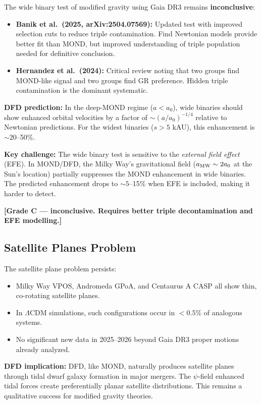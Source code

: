 \documentclass[11pt]{article}
\newcommand{\LCDM}{$\Lambda$CDM}
\newcommand{\aM}{a_0}
\begin{document}
The wide binary test of modified gravity using Gaia DR3 remains
\textbf{inconclusive}:

\begin{itemize}
  \item \textbf{Banik et al.\ (2025, arXiv:2504.07569):} Updated test
    with improved selection cuts to reduce triple contamination.
    Find Newtonian models provide better fit than MOND, but improved
    understanding of triple population needed for definitive conclusion.
  \item \textbf{Hernandez et al.\ (2024):} Critical review noting that
    two groups find MOND-like signal and two groups find GR preference.
    Hidden triple contamination is the dominant systematic.
\end{itemize}

\textbf{DFD prediction:} In the deep-MOND regime ($a < \aM$), wide
binaries should show enhanced orbital velocities by a factor of
$\sim (a/\aM)^{-1/4}$ relative to Newtonian predictions. For the
widest binaries ($s > 5$ kAU), this enhancement is $\sim 20$--50\%.

\textbf{Key challenge:} The wide binary test is sensitive to the
\emph{external field effect} (EFE). In MOND/DFD, the Milky Way's
gravitational field ($a_{\rm MW} \sim 2\aM$ at the Sun's location)
partially suppresses the MOND enhancement in wide binaries. The
predicted enhancement drops to $\sim 5$--15\% when EFE is included,
making it harder to detect.

\textbf{[Grade C --- inconclusive. Requires better triple decontamination
and EFE modelling.]}

\subsection{Satellite Planes Problem}

The satellite plane problem persists:
\begin{itemize}
  \item Milky Way VPOS, Andromeda GPoA, and Centaurus A CASP all show
    thin, co-rotating satellite planes.
  \item In \LCDM{} simulations, such configurations occur in $< 0.5\%$
    of analogous systems.
  \item No significant new data in 2025--2026 beyond Gaia DR3 proper
    motions already analyzed.
\end{itemize}

\textbf{DFD implication:} DFD, like MOND, naturally produces satellite
planes through tidal dwarf galaxy formation in major mergers. The
$\psi$-field enhanced tidal forces create preferentially planar
satellite distributions. This remains a qualitative success for
modified gravity theories.
\end{document}
